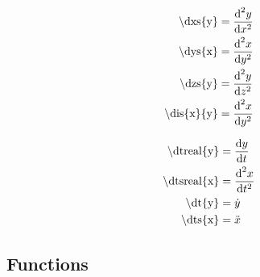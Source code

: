 \begin{subequations}
\begin{align}
\textrm{\textbackslash dxs\{y\}}            & = \frac{\textrm{d}^2 y}{\textrm{d}x^2}             \label{eqn:dxs} \\
\textrm{\textbackslash dys\{x\}}            & = \frac{\textrm{d}^2 x}{\textrm{d}y^2}             \label{eqn:dys} \\
\textrm{\textbackslash dzs\{y\}}            & = \frac{\textrm{d}^2 y}{\textrm{d}z^2}             \label{eqn:dzs} \\
\textrm{\textbackslash dis\{x\}\{y\}}       & = \frac{\textrm{d}^2 x}{\textrm{d}y^2}          \label{eqn:dis}
\end{align}
\end{subequations}

\begin{subequations}
\begin{align}
\textrm{\textbackslash dtreal\{y\}}         & = \frac{\textrm{d} y}{\textrm{d} t}          \label{eqn:dtreal} \\
\textrm{\textbackslash dtsreal\{x\}}        & = \frac{\textrm{d}^2 x}{\textrm{d}t^2}         \label{eqn:dtsreal} \\
\textrm{\textbackslash dt\{y\}}             & = \dot{y}              \label{eqn:dt} \\
\textrm{\textbackslash dts\{x\}}            & = \ddot{x}             \label{eqn:dts}
\end{align}
\end{subequations}





\subsection{Functions}


